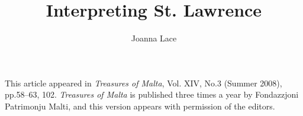 \documentclass[a4paper,12pt]{article}
\begin{document}
\title{Interpreting St. Lawrence}
\author{Joanna Lace}
\date{}
\maketitle


{\narrower This article appeared in {\it Treasures of Malta},
  Vol. XIV, No.3 (Summer 2008), pp.58--63, 102.  {\it Treasures of
    Malta} is published three times a year by Fondazzjoni Patrimonju
  Malti, and this version appears with permission of the editors.  }
\end{document}
